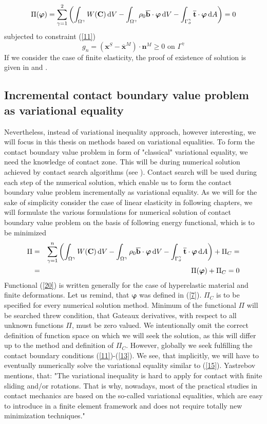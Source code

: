 \documentclass{article}
\newcommand{\beq}{\begin{equation}}
\newcommand{\eeq}{\end{equation}}
\newcommand{\bea}{\begin{eqnarray}}
\newcommand{\eea}{\end{eqnarray}}
\newcommand{\dd}{\,{\rm d}}
\begin{document}
\begin{equation}\label{19}
\Pi(\bm{\varphi}) = \sum^{2}_{\gamma = 1}\left(\int_{\Omega^{\gamma}} W(\mathbf{C})\dd V-\int_{\Omega^{\gamma}} \rho_{0}\overline{\mathbf{b}} \cdot \mathbf{\bm{\varphi}} \dd V-\int_{\Gamma_{\sigma}^{\gamma}} \overline{\mathbf{t}} \cdot \mathbf{\bm{\varphi}} \dd A\right)=0
\end{equation}
subjected to constraint (\ref{11})
\beq
g_{n}=\left(\mathbf{x}^{S}-\overline{\mathbf{x}}^{M}\right) \cdot \mathbf{n}^{M} \geq 0 \text{ on } \Gamma^{\gamma} 
\nonumber
\eeq
If we consider the case of finite elasticity, the proof of existence of solution is given in \cite{Ciarlet} and \cite{Curnier}.
\subsection{Incremental contact boundary value problem as variational equality}
Nevertheless, instead of variational inequality approach, however interesting, we will focus in this thesis on methods based on variational equalities. To form the contact boundary value problem in form of "classical" variational equality, we need the knowledge of contact zone. This will be during numerical solution achieved by contact search algorithms (see \cite[Chapter 9]{Wriggers}). Contact search will be used during each step of the numerical solution, which enable us to form the contact boundary value problem incrementally as variational equality. As we will for the sake of simplicity consider the case of linear elasticity in following chapters, we will formulate the various formulations for numerical solution of contact boundary value problem on the basis of following energy functional, which is to be minimized
\bea\label{20}
\Pi&=&\sum^{n}_{\gamma = 1}\left(\int_{\Omega^{\gamma}} W(\mathbf{C})\dd V-\int_{\Omega^{\gamma}} \rho_{0}\overline{\mathbf{b}} \cdot \mathbf{\bm{\varphi}} \dd V-\int_{\Gamma_{\sigma}^{\gamma}} \overline{\mathbf{t}} \cdot \mathbf{\bm{\varphi}} \dd A\right) + \Pi_{C}=
\nonumber
\\
&=&\Pi(\bm{\varphi})+ \Pi_{C} = 0
\eea
Functional (\ref{20}) is written generally for the case of hyperelastic material and finite deformations. Let us remind, that $ \mathbf{\bm{\varphi}} $ was defined in (\ref{7}). $ \Pi_{C} $ is to be specified for every numerical solution method. Minimum of the functional $ \Pi $ will be searched threw condition, that Gateaux derivatives, with respect to all unknown functions $ \Pi $, must be zero valued. We intentionally omit the correct definition of function space on which we will seek the solution, as this will differ up to the method and definition of $ \Pi_{C} $. However, globally we seek fulfilling the contact boundary conditions (\ref{11})-(\ref{13}). We see, that implicitly, we will have to eventually numerically solve the variational equality similar to (\ref{15}). Yastrebov \cite[Chapter 4, p.144]{Yastrebov} mentions, that: "The variational inequality is hard to apply for contact with finite sliding and/or rotations. That is why, nowadays, most of the practical studies in contact mechanics are based on the
so-called variational equalities, which are easy to introduce in a finite element
framework and does not require totally new minimization techniques."   
\newpage
\end{document}
